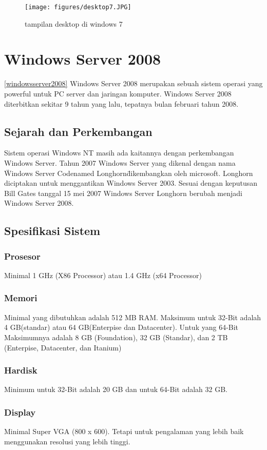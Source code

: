 \cite{zhang2010exploratory} 

\begin{figure}[ht]
\centerline{\texttt{[image: figures/desktop7.JPG]}}
\caption{tampilan desktop di windows 7}
\label{desktop7}
\end{figure}

	\section{Windows Server 2008}
\ref{windowsserver2008}
	Windows Server 2008 merupakan sebuah sistem operasi yang powerful untuk PC server dan jaringan komputer. Windows Server 2008 diterbitkan sekitar 9 tahun yang lalu, tepatnya bulan februari tahun 2008.\cite{wahyono2009practice}
	\subsection{Sejarah dan Perkembangan}
		Sistem operasi Windows NT masih ada kaitannya dengan perkembangan Windows Server. Tahun 2007 Windows Server yang dikenal dengan nama \" Windows Server Codenamed Longhorn\" dikembangkan oleh microsoft. Longhorn diciptakan untuk menggantikan Windows Server 2003. Sesuai dengan keputusan Bill Gates tanggal 15 mei 2007 Windows Server Longhorn berubah menjadi Windows Server 2008.
	\subsection{Spesifikasi Sistem}
		\subsubsection{Prosesor}
		Minimal 1 GHz (X86 Processor) atau 1.4 GHz (x64 Processor)
		\subsubsection{Memori}
		Minimal yang dibutuhkan adalah 512 MB RAM. Maksimum untuk 32-Bit adalah 4 GB(standar) atau 64 GB(Enterpise dan Datacenter). Untuk yang 64-Bit Maksimumnya adalah 8 GB (Foundation), 32 GB (Standar), dan 2 TB (Enterpise, Datacenter, dan Itanium)
		\subsubsection{Hardisk}
		Minimum untuk 32-Bit adalah 20 GB dan untuk 64-Bit adalah 32 GB.
		\subsubsection{Display}
		Minimal Super VGA (800 x 600). Tetapi untuk pengalaman yang lebih baik menggunakan resolusi yang lebih tinggi.

